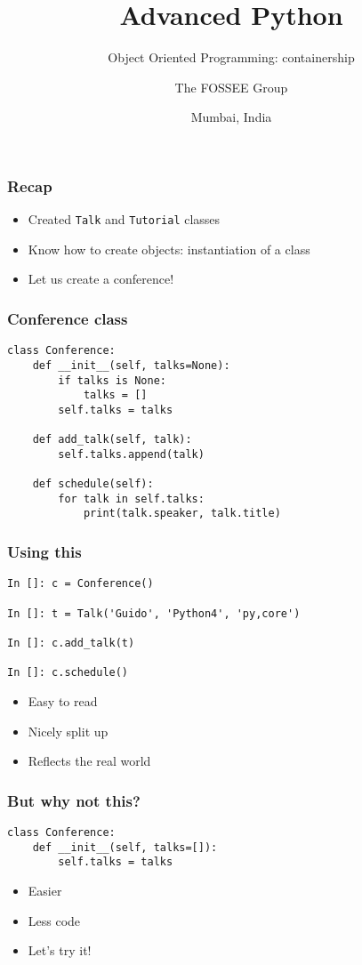 \documentclass[14pt,compress,aspectratio=169]{beamer}
\title[OOP containership]{Advanced Python}
\subtitle{Object Oriented Programming: containership }
\author[FOSSEE] {The FOSSEE Group}
\institute[IIT Bombay] {Department of Aerospace Engineering\\IIT Bombay}
\date[] {Mumbai, India}
\begin{document}
\begin{frame}
  \titlepage
\end{frame}

\begin{frame}
  \frametitle{Recap}
  \begin{itemize}
  \item Created \lstinline{Talk} and \lstinline{Tutorial} classes
  \item Know how to create objects: instantiation of a class
    \vspace*{0.5in}

  \item Let us create a conference!
  \end{itemize}
\end{frame}

\begin{frame}[fragile]
  \frametitle{Conference class}
  \vspace*{-0.1in}
\begin{lstlisting}
class Conference:
    def __init__(self, talks=None):
        if talks is None:
            talks = []
        self.talks = talks

    def add_talk(self, talk):
        self.talks.append(talk)

    def schedule(self):
        for talk in self.talks:
            print(talk.speaker, talk.title)
\end{lstlisting}
\end{frame}

\begin{frame}[fragile]
  \frametitle{Using this}
\begin{lstlisting}
In []: c = Conference()

In []: t = Talk('Guido', 'Python4', 'py,core')

In []: c.add_talk(t)

In []: c.schedule()

\end{lstlisting}
  \begin{itemize}
  \item Easy to read
  \item Nicely split up
  \item Reflects the real world

  \end{itemize}
\end{frame}

\begin{frame}[fragile]
  \frametitle{But why not this?}
\begin{lstlisting}
class Conference:
    def __init__(self, talks=[]):
        self.talks = talks
\end{lstlisting}
  \begin{itemize}
  \item Easier
  \item Less code
  \item Let's try it!
  \end{itemize}
\end{frame}
\end{document}
